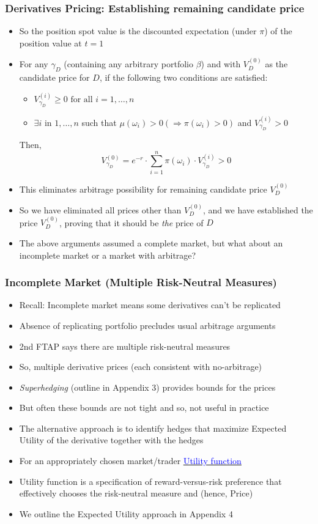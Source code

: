 \documentclass{beamer}
\begin{document}
\begin{frame}
\frametitle{Derivatives Pricing: Establishing remaining candidate price}
\begin{itemize}
\item So the position spot value is the discounted expectation (under $\pi$) of the position value at $t=1$
\item For any $\gamma_D$ (containing any arbitrary portfolio $\beta$) and with $V_D^{(0)}$ as the candidate price for $D$, if the following two conditions are satisfied:
\begin{itemize}
\item $V_{\gamma_D}^{(i)} \geq 0 \mbox{ for all } i = 1, \ldots,n$
\item $\exists i$ in $1, \ldots, n$ such that $\mu(\omega_i) > 0 (\Rightarrow \pi(\omega_i) > 0)$ and $V_{\gamma_D}^{(i)} > 0$
\end{itemize}
Then, $$V_{\gamma_D}^{(0)} = e^{-r} \cdot \sum_{i=1}^n \pi(\omega_i) \cdot V_{\gamma_D}^{(i)} > 0$$
\item This eliminates arbitrage possibility for remaining candidate price $V_D^{(0)}$
\item So we have eliminated all prices other than $V_D^{(0)}$, and we have established the price $V_D^{(0)}$, proving that it should be {\em the} price of $D$
\item The above arguments assumed a complete market, but what about an incomplete market or a market with arbitrage?
\end{itemize}
\end{frame}

\begin{frame}
\frametitle{Incomplete Market (Multiple Risk-Neutral Measures)}
\begin{itemize}
\item Recall: Incomplete market means some derivatives can't be replicated
\item Absence of replicating portfolio precludes usual arbitrage arguments
\item 2nd FTAP says there are multiple risk-neutral measures
\item So, multiple derivative prices (each consistent with no-arbitrage)
\item {\em Superhedging} (outline in Appendix 3) provides bounds for the prices
\item But often these bounds are not tight and so, not useful in practice
\item The alternative approach is to identify hedges that maximize Expected Utility of the derivative together with the hedges
\item For an appropriately chosen market/trader \href{https://github.com/coverdrive/technical-documents/blob/master/finance/cme241/UtilityTheoryForRisk.pdf}{\underline{\textcolor{blue}{Utility function}}} 
\item Utility function is a specification of reward-versus-risk preference that effectively chooses the risk-neutral measure and (hence, Price)
\item We outline the Expected Utility approach in Appendix 4
\end{itemize}
\end{frame}
\end{document}
